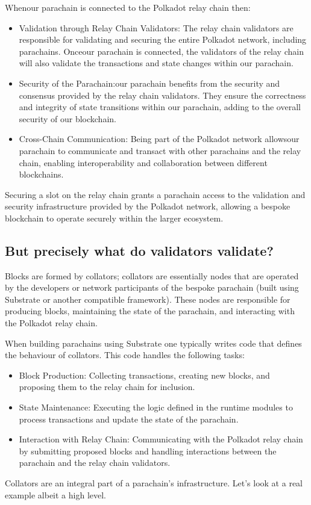 \documentclass{tufte-handout}
\begin{document}
Whenour parachain is connected to the Polkadot relay chain then:
\begin{itemize}
\item Validation through Relay Chain Validators: The relay chain validators are responsible for validating and securing the entire Polkadot network, including parachains. Onceour
parachain is connected, the validators of the relay chain will also validate the transactions and state changes within our parachain.
\item Security of the Parachain:our parachain benefits from the security and consensus provided by the relay chain validators. They ensure the correctness and integrity of
state transitions within our parachain, adding to the overall security of our blockchain.
\item Cross-Chain Communication: Being part of the Polkadot network allowsour parachain to communicate and transact with other parachains and the relay chain, enabling
interoperability and collaboration between different blockchains.
\end{itemize}
Securing a slot on the relay chain grants a parachain access to the validation and security infrastructure provided by the Polkadot network, allowing a bespoke blockchain
to operate securely within the larger ecosystem.

\subsection{But precisely what do validators validate?}\label{sec:headings}
Blocks are formed by collators; collators are essentially nodes that are operated by the developers or network participants of the bespoke parachain (built using Substrate or
another compatible framework). These nodes are responsible for producing blocks, maintaining the state of the parachain, and interacting with the Polkadot relay chain.

When building parachains using Substrate one typically writes code that defines the behaviour of collators. This code handles the following tasks:
\begin{itemize}
\item Block Production: Collecting transactions, creating new blocks, and proposing them to the relay chain for inclusion.
\item State Maintenance: Executing the logic defined in the runtime modules to process transactions and update the state of the parachain.
\item Interaction with Relay Chain: Communicating with the Polkadot relay chain by submitting proposed blocks and handling interactions between the parachain and the relay
chain validators.
\end{itemize}
Collators are an integral part of a parachain's infrastructure. Let's look at a real example albeit a high level.
\end{document}
